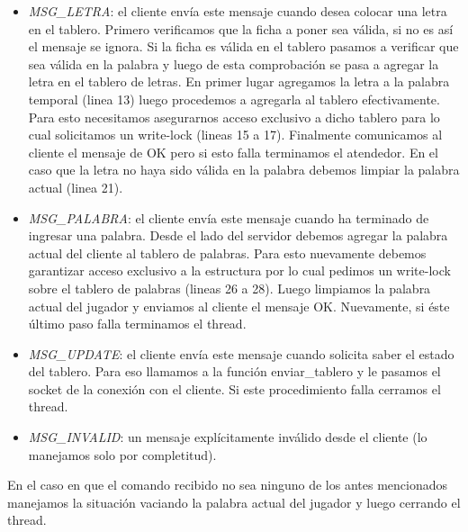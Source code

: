 \documentclass[a4paper,11pt]{article}
\begin{document}
	\begin{itemize}
		\item \emph{MSG\_LETRA}: el cliente envía este mensaje cuando desea colocar una letra en el tablero. Primero verificamos que la ficha a poner sea válida, si no es así el mensaje se ignora. Si la ficha es válida en el tablero pasamos a verificar que sea válida en la palabra y luego de esta comprobación se pasa a agregar la letra en el tablero de letras. En primer lugar agregamos la letra a la palabra temporal (linea 13) luego procedemos a agregarla al tablero efectivamente. Para esto necesitamos asegurarnos acceso exclusivo a dicho tablero para lo cual solicitamos un write-lock (lineas 15 a 17). Finalmente comunicamos al cliente el mensaje de OK pero si esto falla terminamos el atendedor. En el caso que la letra no haya sido válida en la palabra debemos limpiar la palabra actual (linea 21).
		
		\item \emph{MSG\_PALABRA}: el cliente envía este mensaje cuando ha terminado de ingresar una palabra. Desde el lado del servidor debemos agregar la palabra actual del cliente al tablero de palabras. Para esto nuevamente debemos garantizar acceso exclusivo a la estructura por lo cual pedimos un write-lock sobre el tablero de palabras (lineas 26 a 28). Luego limpiamos la palabra actual del jugador y enviamos al cliente el mensaje OK. Nuevamente, si éste último paso falla terminamos el thread.
		
		\item \emph{MSG\_UPDATE}: el cliente envía este mensaje cuando solicita saber el estado del tablero. Para eso llamamos a la función enviar\_tablero y le pasamos el socket de la conexión con el cliente. Si este procedimiento falla cerramos el thread.
		
		\item \emph{MSG\_INVALID}: un mensaje explícitamente inválido desde el cliente (lo manejamos solo por completitud).
	
	\end{itemize}
	
	En el caso en que el comando recibido no sea ninguno de los antes mencionados manejamos la situación vaciando la palabra actual del jugador y luego cerrando el thread.
	
	
	
\end{document}
